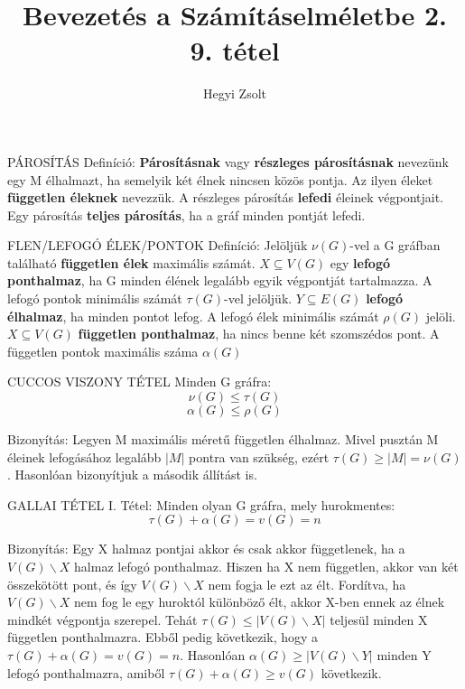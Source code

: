 \documentclass[]{article}
\title{Bevezetés a Számításelméletbe 2.\\{\large 9. tétel}}
\author{Hegyi Zsolt}
\begin{document}
\maketitle
\begin{shaded}
PÁROSÍTÁS Definíció: \textbf{Párosításnak} vagy \textbf{részleges párosításnak} nevezünk egy M élhalmazt, ha semelyik két élnek nincsen közös pontja. Az ilyen éleket \textbf{független éleknek} nevezzük. A részleges párosítás \textbf{lefedi} éleinek végpontjait. Egy párosítás \textbf{teljes párosítás}, ha a gráf minden pontját lefedi.
\end{shaded}
\begin{shaded}
FLEN/LEFOGÓ ÉLEK/PONTOK Definíció: Jelöljük $\nu(G)$-vel a G gráfban található \textbf{független élek} maximális számát. $X \subseteq V(G)$ egy \textbf{lefogó ponthalmaz}, ha G minden élének legalább egyik végpontját tartalmazza. A lefogó pontok minimális számát $\tau(G)$-vel jelöljük. $Y \subseteq E(G)$ \textbf{lefogó élhalmaz}, ha minden pontot lefog. A lefogó élek minimális számát $\rho(G)$ jelöli. $X \subseteq V(G)$ \textbf{független ponthalmaz}, ha nincs benne két szomszédos pont. A független pontok maximális száma $\alpha(G)$
\end{shaded}
\begin{framed}
CUCCOS VISZONY TÉTEL Minden G gráfra:
$$\nu(G) \leq \tau(G)$$
$$\alpha(G) \leq \rho(G)$$
\end{framed}
\begin{leftbar}
Bizonyítás: Legyen M maximális méretű független élhalmaz. Mivel pusztán M éleinek lefogásához legalább $|M|$ pontra van szükség, ezért $\tau(G) \geq |M| = \nu(G)$.
Hasonlóan bizonyítjuk a második állítást is.
\end{leftbar}
\begin{framed}
GALLAI TÉTEL I. Tétel: Minden olyan G gráfra, mely hurokmentes:
$$\tau(G) + \alpha(G) = v(G) = n$$
\end{framed}
\begin{leftbar}
Bizonyítás: Egy X halmaz pontjai akkor és csak akkor függetlenek, ha a $V(G)\backslash X$ halmaz lefogó ponthalmaz. Hiszen ha X nem független, akkor van két összekötött pont, és így $V(G)\backslash X$ nem fogja le ezt az élt. Fordítva, ha $V(G)\backslash X$ nem fog le egy huroktól különböző élt, akkor X-ben ennek az élnek mindkét végpontja szerepel. Tehát $\tau(G) \leq |V(G)\backslash X|$ teljesül minden X független ponthalmazra. Ebből pedig következik, hogy a $\tau(G) + \alpha(G) = v(G) = n$. Hasonlóan $\alpha(G) \geq |V(G) \backslash Y|$ minden Y lefogó ponthalmazra, amiből $\tau(G) + \alpha(G) \geq v(G)$ következik.
\end{leftbar}
\end{document}
